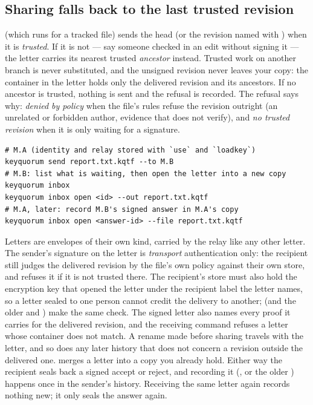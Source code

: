 \subsection{Sharing falls back to the last trusted revision}

 (which runs  for a tracked file) sends the head
(or the revision named with ) when it is \emph{trusted}. If it is not --- say someone
checked in an edit without signing it --- the letter carries its nearest
trusted \emph{ancestor} instead. Trusted work on another branch is never
substituted, and the unsigned revision never leaves your copy: the container
in the letter holds only the delivered revision and its ancestors. If no
ancestor is trusted, nothing is sent and the refusal is recorded. The
refusal says why: \emph{denied by policy} when the file's rules refuse the
revision outright (an unrelated or forbidden author, evidence that does not
verify), and \emph{no trusted revision} when it is only waiting for a
signature.

\begin{lstlisting}
# M.A (identity and relay stored with `use` and `loadkey`)
keyquorum send report.txt.kqtf --to M.B
# M.B: list what is waiting, then open the letter into a new copy
keyquorum inbox
keyquorum inbox open <id> --out report.txt.kqtf
# M.A, later: record M.B's signed answer in M.A's copy
keyquorum inbox open <answer-id> --file report.txt.kqtf
\end{lstlisting}

Letters are  envelopes of their own kind, carried by the relay
like any other letter. The sender's signature on the letter is
\emph{transport} authentication only: the recipient still judges the
delivered revision by the file's own policy against their own store, and
refuses it if it is not trusted there. The recipient's store must also hold the encryption key that
opened the letter under the recipient label the letter names, so a letter
sealed to one person cannot credit the delivery to another;  (and the older
 and ) make the same check. The signed
letter also names every proof it carries for the delivered revision, and the
receiving command refuses a letter whose container does not match. A rename made before sharing travels with the
letter, and so does any later history that does not concern a revision
outside the delivered one.  merges a letter into a
copy you already hold. Either way the recipient seals back a signed accept
or reject, and recording it (, or the older
) happens once in the sender's history.
Receiving the same letter again records nothing new; it only seals the
answer again.

